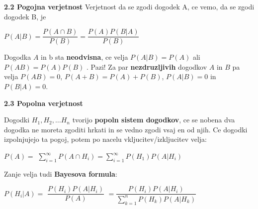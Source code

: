 \documentclass{article}
\begin{document}
\begin{multicols}{3}
	\textbf{2.2 Pogojna verjetnost}
	Verjetnost da se zgodi dogodek A, ce vemo, da se zgodi dogodek B, je
	\begin{center}
		\begin{math}
			P(A | B) = \dfrac{P(A \cap B)}{P(B)} = \dfrac{P(A)P(B|A)}{P(B)}
		\end{math}
	\end{center}
	Dogodka $A$ in b sta \textbf{neodvisna}, ce velja $P(A | B) = P(A)$ ali
	$P(A B) = P(A)P(B)$ .
	Pazi! Za par \textbf{nezdruzljivih} dogodkov $A$ in $B$
	pa velja $P(AB) = 0$,  $P(A + B) = P(A) + P(B)$, $P(A|B) = 0$ in $P(B|A) = 0$.

	\textbf{2.3 Popolna verjetnost}

	Dogodki $H_{1}, H_{2}, \dots H_{n}$ tvorijo \textbf{popoln sistem dogodkov},
	ce se nobena dva dogodka ne moreta zgoditi hrkati in se vedno
	zgodi vsaj en od njih. Ce dogodki izpolnjujejo ta pogoj, potem po
	nacelu vkljucitev/izkljucitev velja:
	\begin{center}
		\begin{math}
			P(A) =
		\end{math}
		\smallskip
		\begin{math}
			\sum_{i=1}^{\infty} P(A \cap H_{i}) =
			\sum_{i=1}^{\infty} P(H_{1}) P(A | H_{i})
		\end{math}
	\end{center}
	Zanje velja tudi \textbf{Bayesova formula}:
	\begin{center}
		\begin{math}
			P(H_{i} | A) =
		\end{math}
		\begin{math}
			\dfrac{
				P(H_{i}) P(A | H_{i})
			}
			{
				P(A)
			}
		\end{math}
		\begin{math}
			= \dfrac{
				P(H_{i}) P(A | H_{i})
			}
			{
				\sum_{k=1}^{n} P(H_{k}) P(A | H_{k})
			}
		\end{math}
	\end{center}


\end{multicols}
\end{document}
